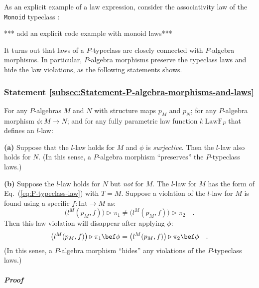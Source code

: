 As an explicit example of a law expression, consider the associativity
law of the \lstinline!Monoid!
typeclass :

{*}{*}{*} add an explicit code example with monoid laws{*}{*}{*}

It turns out that laws of a $P$-typeclass are closely connected with
$P$-algebra morphisms. In particular, $P$-algebra morphisms preserve
the typeclass laws and hide the law violations, as the following statements
shows.

\subsubsection{Statement \label{subsec:Statement-P-algebra-morphisms-and-laws}\ref{subsec:Statement-P-algebra-morphisms-and-laws}}

For any $P$-algebras $M$ and $N$ with structure maps $p_{M}$ and
$p_{N}$; for any $P$-algebra morphism $\phi:M\rightarrow N$; and
for any fully parametric law function $l:\text{LawF}_{P}$ that defines
an $l$-law:

\textbf{(a)} Suppose that the $l$-law holds for $M$ and $\phi$
is \emph{surjective}. Then the $l$-law also holds for $N$. (In this
sense, a $P$-algebra morphism \textsf{``}preserves\textsf{''} the $P$-typeclass
laws.)

\textbf{(b)} Suppose the $l$-law holds for $N$ but \emph{not} for
$M$. The $l$-law for $M$ has the form of Eq.~(\ref{eq:P-typeclass-law})
with $T=M$. Suppose a violation of the $l$-law for $M$ is found
using a specific $f:\text{Int}\rightarrow M$ as:
\begin{equation}
\big(l^{M}(p_{M},f)\big)\triangleright\pi_{1}\neq\big(l^{M}(p_{M},f)\big)\triangleright\pi_{2}\quad.\label{eq:p-typeclass-law-violation}
\end{equation}
Then this law violation will disappear after applying $\phi$:
\begin{equation}
\big(l^{M}(p_{M},f)\big)\triangleright\pi_{1}\bef\phi=\big(l^{M}(p_{M},f)\big)\triangleright\pi_{2}\bef\phi\quad.\label{eq:p-typeclass-law-violation-hidden}
\end{equation}
(In this sense, a $P$-algebra morphism \textsf{``}hides\textsf{''} any violations
of the $P$-typeclass laws.)

\subparagraph{Proof}

